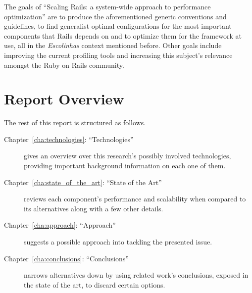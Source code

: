 The goals of ``Scaling Rails: a system-wide approach to performance optimization'' are to produce the aforementioned generic conventions and guidelines, to find generalist optimal configurations for the most important components that Rails depends on and to optimize them for the framework at use, all in the \textit{Escolinhas} context mentioned before. Other goals include improving the current profiling tools and increasing this subject's relevance amongst the Ruby on Rails community.


\section{Report Overview} %
\label{sec:report_overview}
The rest of this report is structured as follows.
\begin{description}
  \item[Chapter~\ref{cha:technologies}: ``Technologies''] gives an overview over this research's possibly involved technologies, providing important background information on each one of them.
  \item[Chapter~\ref{cha:state_of_the_art}: ``State of the Art''] reviews each component's performance and scalability when compared to its alternatives along with a few other details.
  \item[Chapter~\ref{cha:approach}: ``Approach''] suggests a possible approach into tackling the presented issue.
  \item[Chapter~\ref{cha:conclusions}: ``Conclusions''] narrows alternatives down by using related work's conclusions, exposed in the state of the art, to discard certain options.
\end{description}

